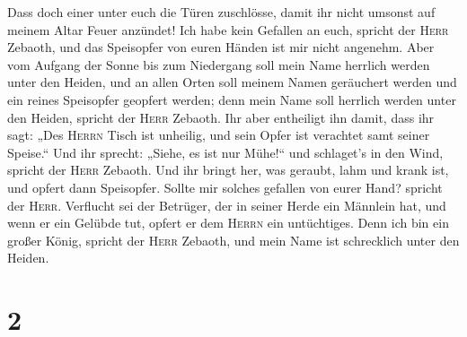  Dass doch einer unter euch die Türen zuschlösse, damit
ihr nicht umsonst auf meinem Altar Feuer anzündet! Ich habe kein
Gefallen an euch, spricht der \textsc{Herr} Zebaoth, und das Speisopfer
von euren Händen ist mir nicht angenehm.  Aber vom
Aufgang der Sonne bis zum Niedergang soll mein Name herrlich werden
unter den Heiden, und an allen Orten soll meinem Namen geräuchert werden
und ein reines Speisopfer geopfert werden; denn mein Name soll herrlich
werden unter den Heiden, spricht der \textsc{Herr} Zebaoth.
 Ihr aber entheiligt ihn damit, dass ihr sagt: „Des
\textsc{Herrn} Tisch ist unheilig, und sein Opfer ist verachtet samt
seiner Speise.``  Und ihr sprecht: „Siehe, es ist nur
Mühe!{}`` und schlaget's in den Wind, spricht der \textsc{Herr} Zebaoth.
Und ihr bringt her, was geraubt, lahm und krank ist, und opfert dann
Speisopfer. Sollte mir solches gefallen von eurer Hand? spricht der
\textsc{Herr}.  Verflucht sei der Betrüger, der in seiner
Herde ein Männlein hat, und wenn er ein Gelübde tut, opfert er dem
\textsc{Herrn} ein untüchtiges. Denn ich bin ein großer König, spricht
der \textsc{Herr} Zebaoth, und mein Name ist schrecklich unter den
Heiden.

\hypertarget{section-1}{%
\section{2}\label{section-1}}

